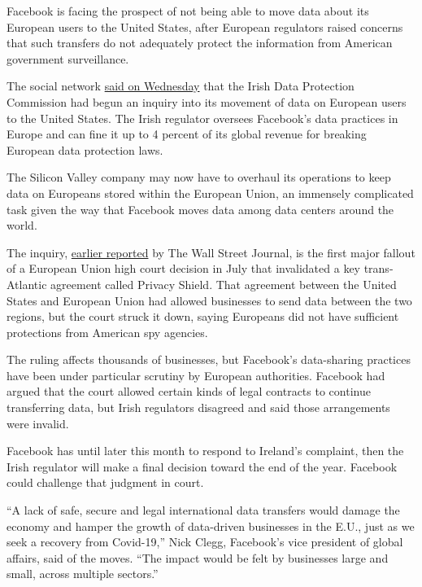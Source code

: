 Facebook is facing the prospect of not being able to move data about its
European users to the United States, after European regulators raised
concerns that such transfers do not adequately protect the information
from American government surveillance.

The social network
\href{https://about.fb.com/news/2020/09/securing-the-long-term-stability-of-cross-border-data-flows/}{said
on Wednesday} that the Irish Data Protection Commission had begun an
inquiry into its movement of data on European users to the United
States. The Irish regulator oversees Facebook's data practices in Europe
and can fine it up to 4 percent of its global revenue for breaking
European data protection laws.

The Silicon Valley company may now have to overhaul its operations to
keep data on Europeans stored within the European Union, an immensely
complicated task given the way that Facebook moves data among data
centers around the world.

The inquiry,
\href{https://www.wsj.com/articles/ireland-to-order-facebook-to-stop-sending-user-data-to-u-s-11599671980?mod=djemalertNEWS}{earlier
reported} by The Wall Street Journal, is the first major fallout of a
European Union high court decision in July that invalidated a key
trans-Atlantic agreement called Privacy Shield. That agreement between
the United States and European Union had allowed businesses to send data
between the two regions, but the court struck it down, saying Europeans
did not have sufficient protections from American spy agencies.

The ruling affects thousands of businesses, but Facebook's data-sharing
practices have been under particular scrutiny by European authorities.
Facebook had argued that the court allowed certain kinds of legal
contracts to continue transferring data, but Irish regulators disagreed
and said those arrangements were invalid.

Facebook has until later this month to respond to Ireland's complaint,
then the Irish regulator will make a final decision toward the end of
the year. Facebook could challenge that judgment in court.

``A lack of safe, secure and legal international data transfers would
damage the economy and hamper the growth of data-driven businesses in
the E.U., just as we seek a recovery from Covid-19,'' Nick Clegg,
Facebook's vice president of global affairs, said of the moves. ``The
impact would be felt by businesses large and small, across multiple
sectors.''

